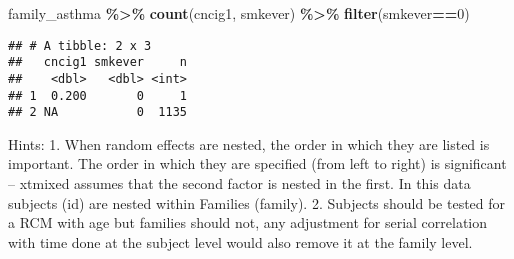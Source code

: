 \documentclass[
]{article}
\newenvironment{Shaded}{\begin{snugshade}}{\end{snugshade}}
\newcommand{\DecValTok}[1]{\textcolor[rgb]{0.00,0.00,0.81}{#1}}
\newcommand{\FunctionTok}[1]{\textcolor[rgb]{0.13,0.29,0.53}{\textbf{#1}}}
\newcommand{\NormalTok}[1]{#1}
\newcommand{\SpecialCharTok}[1]{\textcolor[rgb]{0.81,0.36,0.00}{\textbf{#1}}}
\begin{document}
\begin{Shaded}
\begin{Highlighting}[]
\NormalTok{family\_asthma }\SpecialCharTok{\%\textgreater{}\%} \FunctionTok{count}\NormalTok{(cncig1, smkever) }\SpecialCharTok{\%\textgreater{}\%} \FunctionTok{filter}\NormalTok{(smkever}\SpecialCharTok{==}\DecValTok{0}\NormalTok{)}
\end{Highlighting}
\end{Shaded}

\begin{verbatim}
## # A tibble: 2 x 3
##   cncig1 smkever     n
##    <dbl>   <dbl> <int>
## 1  0.200       0     1
## 2 NA           0  1135
\end{verbatim}

Hints: 1. When random effects are nested, the order in which they are
listed is important. The order in which they are specified (from left to
right) is significant -- xtmixed assumes that the second factor is
nested in the first. In this data subjects (id) are nested within
Families (family). 2. Subjects should be tested for a RCM with age but
families should not, any adjustment for serial correlation with time
done at the subject level would also remove it at the family level.
\end{document}
